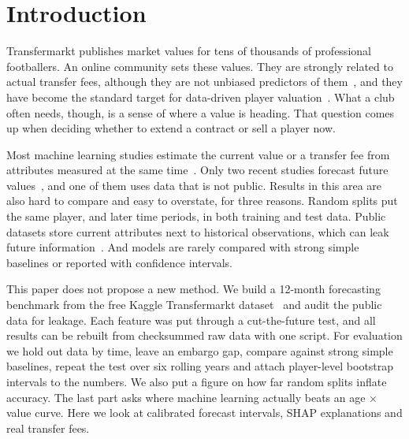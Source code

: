 \documentclass[conference]{IEEEtran}
\begin{document}
\section{Introduction}

Transfermarkt publishes market values for tens of thousands of professional footballers. An online community sets these values. They are strongly related to actual transfer fees, although they are not unbiased predictors of them~\cite{coates2022wisdom}, and they have become the standard target for data-driven player valuation~\cite{mueller2017beyond,franceschi2024determinants}. What a club often needs, though, is a sense of where a value is heading. That question comes up when deciding whether to extend a contract or sell a player now.

Most machine learning studies estimate the current value or a transfer fee from attributes measured at the same time~\cite{mueller2017beyond,yigit2020xgboost,behravan2021novel,alasadi2022predict,aydemir2022ensembling,mchale2023estimating,huang2023explainable,tamim2025machine,fotache2026machine,wang2026predicting,li2026interpretable}. Only two recent studies forecast future values~\cite{baouan2025what,vanarem2025forecasting}, and one of them uses data that is not public. Results in this area are also hard to compare and easy to overstate, for three reasons. Random splits put the same player, and later time periods, in both training and test data. Public datasets store current attributes next to historical observations, which can leak future information~\cite{kapoor2023leakage}. And models are rarely compared with strong simple baselines or reported with confidence intervals.

This paper does not propose a new method. We build a 12-month forecasting benchmark from the free Kaggle Transfermarkt dataset~\cite{kaggle_transfermarkt} and audit the public data for leakage. Each feature was put through a cut-the-future test, and all results can be rebuilt from checksummed raw data with one script. For evaluation we hold out data by time, leave an embargo gap, compare against strong simple baselines, repeat the test over six rolling years and attach player-level bootstrap intervals to the numbers. We also put a figure on how far random splits inflate accuracy. The last part asks where machine learning actually beats an age $\times$ value curve. Here we look at calibrated forecast intervals, SHAP explanations and real transfer fees.

\end{document}
